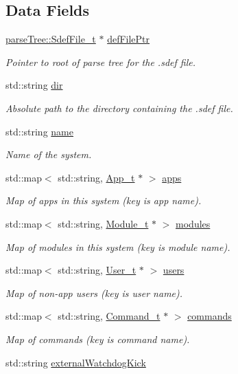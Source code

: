 \subsection*{Data Fields}
\begin{DoxyCompactItemize}
\item 
\hyperlink{structparse_tree_1_1_sdef_file__t}{parse\+Tree\+::\+Sdef\+File\+\_\+t} $\ast$ \hyperlink{struct_system__t_aeb7f438e21368b4ab7ca857ed81fe59a}{def\+File\+Ptr}
\begin{DoxyCompactList}\small\item\em Pointer to root of parse tree for the .sdef file. \end{DoxyCompactList}\item 
std\+::string \hyperlink{struct_system__t_afcf491aa7a2efa92f5aeac4e33bad59a}{dir}
\begin{DoxyCompactList}\small\item\em Absolute path to the directory containing the .sdef file. \end{DoxyCompactList}\item 
std\+::string \hyperlink{struct_system__t_af6e6ba67877c62c0b3f9bcc468e822ed}{name}
\begin{DoxyCompactList}\small\item\em Name of the system. \end{DoxyCompactList}\item 
std\+::map$<$ std\+::string, \hyperlink{struct_app__t}{App\+\_\+t} $\ast$ $>$ \hyperlink{struct_system__t_aeb73079f3d05688ed1f5c8bbd2bfded9}{apps}
\begin{DoxyCompactList}\small\item\em Map of apps in this system (key is app name). \end{DoxyCompactList}\item 
std\+::map$<$ std\+::string, \hyperlink{struct_module__t}{Module\+\_\+t} $\ast$ $>$ \hyperlink{struct_system__t_af643d722d60da7a06849ec6a7c0bd918}{modules}
\begin{DoxyCompactList}\small\item\em Map of modules in this system (key is module name). \end{DoxyCompactList}\item 
std\+::map$<$ std\+::string, \hyperlink{struct_user__t}{User\+\_\+t} $\ast$ $>$ \hyperlink{struct_system__t_abd903872c2c0a057976fbc82431ab9f8}{users}
\begin{DoxyCompactList}\small\item\em Map of non-\/app users (key is user name). \end{DoxyCompactList}\item 
std\+::map$<$ std\+::string, \hyperlink{struct_command__t}{Command\+\_\+t} $\ast$ $>$ \hyperlink{struct_system__t_ad8e2ec3694287e92e2bb44b59347df65}{commands}
\begin{DoxyCompactList}\small\item\em Map of commands (key is command name). \end{DoxyCompactList}\item 
std\+::string \hyperlink{struct_system__t_a64100bed48bb1e5874feb2db7c2db1a8}{external\+Watchdog\+Kick}
\end{DoxyCompactItemize}


